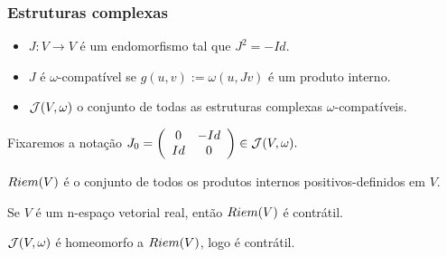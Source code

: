 \documentclass{beamer}
\begin{document}
	\begin{frame}
		\frametitle{Estruturas complexas}
		
		\begin{definicao}
			\begin{itemize}
				\item $J: V \to V$ é um endomorfismo tal que $J^{2} = -Id$. 
				
				\item $J$ é $\omega$-compatível se $g(u,v):=\omega(u, Jv)$ é um produto interno. 
				
				\item $\mathcal{J}(V, \omega)$ o conjunto de todas as estruturas complexas $\omega$-compatíveis.
				
			\end{itemize}
		\end{definicao}
		Fixaremos a notação
			$
			J_{0}=
			\left(
			\begin{array}{cc}
			0 & -Id
			\\
			Id & 0
			\end{array}
			\right) \in \mathcal{J}(V, \omega) .
			$
	\end{frame}
	
	\begin{frame}
		
		\begin{definicao}
			$Riem(V)$ é o conjunto de todos os produtos internos positivos-definidos em $V$.
		\end{definicao}
		
		
		\begin{proposicao}
			Se $V$ é um n-espaço vetorial real, então $Riem(V)$ é contrátil.
		\end{proposicao}
		
		\begin{proposicao}
			$\mathcal{J}(V, \omega)$ é homeomorfo a $Riem(V)$, logo é contrátil.
		\end{proposicao}
	\end{frame}
	
\end{document}
